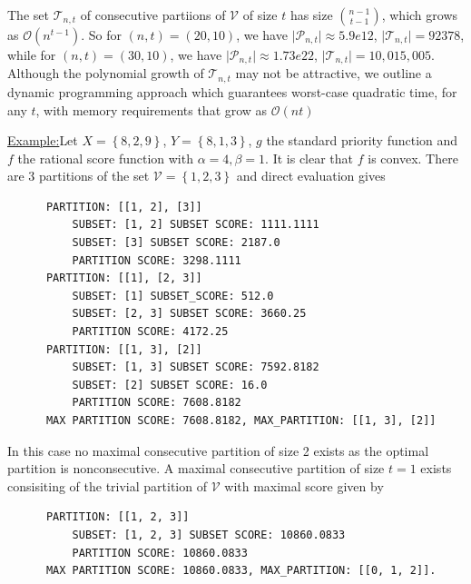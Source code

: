 \documentclass{article}
\theoremstyle{case}
\newenvironment{example}[1]{\par\noindent\underline{Example:}\space#1}{}
\begin{document}
The set $\mathcal{T}_{n,t}$ of consecutive partiions of $\mathcal{V}$ of size $t$ has size $\binom{n-1}{t-1}$, which grows as $\mathcal{O}\left( n^{t-1}\right)$. So for $\left(n,t\right) = \left(20, 10\right)$, we have $\vert \mathcal{P}_{n,t}\vert \approx 5.9e12$, $\vert \mathcal{T}_{n,t}\vert = 92378$, while for $\left(n,t\right) = \left(30, 10\right)$, we have $\vert \mathcal{P}_{n,t}\vert \approx 1.73e22$, $\vert \mathcal{T}_{n,t}\vert = 10,015,005$.  Although the polynomial growth of $\mathcal{T}_{n,t}$ may not be attractive, we outline a dynamic programming approach which guarantees worst-case quadratic time, for any $t$, with memory requirements that grow as $\mathcal{O}\left( nt\right)$


\vspace{4pt}

\begin{example}
Let $X = \left\lbrace 8, 2, 9\right\rbrace$, $Y = \left\lbrace  8, 1, 3\right\rbrace$, $g$ the standard priority function and $f$ the rational score function with $\alpha = 4, \beta = 1$. It is clear that $f$ is convex. There are 3 partitions of the set $\mathcal{V} = \left\lbrace 1,2,3 \right\rbrace$ and direct evaluation gives
\begin{verbatim}
      PARTITION: [[1, 2], [3]]
          SUBSET: [1, 2] SUBSET SCORE: 1111.1111
          SUBSET: [3] SUBSET SCORE: 2187.0
          PARTITION SCORE: 3298.1111
      PARTITION: [[1], [2, 3]]
          SUBSET: [1] SUBSET_SCORE: 512.0
          SUBSET: [2, 3] SUBSET SCORE: 3660.25
          PARTITION SCORE: 4172.25
      PARTITION: [[1, 3], [2]]
          SUBSET: [1, 3] SUBSET SCORE: 7592.8182
          SUBSET: [2] SUBSET SCORE: 16.0
          PARTITION SCORE: 7608.8182
      MAX PARTITION SCORE: 7608.8182, MAX_PARTITION: [[1, 3], [2]]
\end{verbatim}
In this case no maximal consecutive partition of size 2 exists as the optimal partition is nonconsecutive. A maximal consecutive partition of size $t = 1$ exists consisiting of the trivial partition of $\mathcal{V}$ with maximal score given by
\begin{verbatim}
      PARTITION: [[1, 2, 3]]
          SUBSET: [1, 2, 3] SUBSET SCORE: 10860.0833
          PARTITION SCORE: 10860.0833
      MAX PARTITION SCORE: 10860.0833, MAX_PARTITION: [[0, 1, 2]].
\end{verbatim}  
\end{example}
\end{document}
